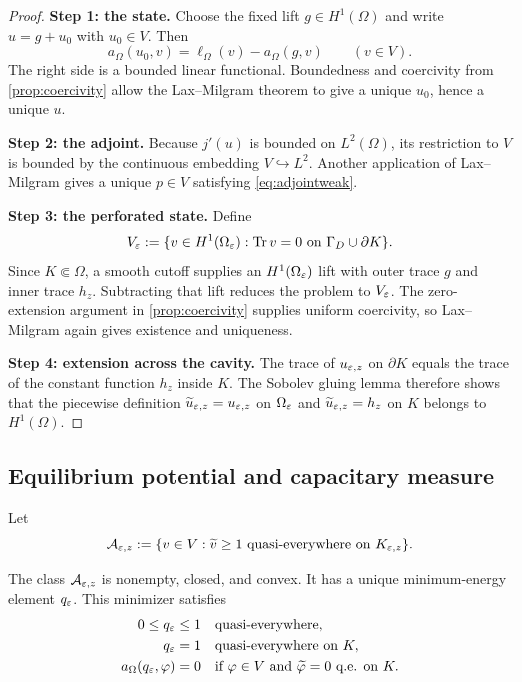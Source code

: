 \begin{proof}
\textbf{Step 1: the state.}
Choose the fixed lift $g\in H^1(\Omega)$ and write $u=g+u_0$ with $u_0\in V$.
Then
\begin{equation}
 a_\Omega(u_0,v)=\ell_\Omega(v)-a_\Omega(g,v)
 \qquad(v\in V).
\end{equation}
The right side is a bounded linear functional.  Boundedness and coercivity
from \cref{prop:coercivity} allow the Lax--Milgram theorem to give a unique
$u_0$, hence a unique $u$.

\textbf{Step 2: the adjoint.}
Because $j'(u)$ is bounded on $L^2(\Omega)$, its restriction to $V$ is bounded
by the continuous embedding $V\hookrightarrow L^2$.  Another application of
Lax--Milgram gives a unique $p\in V$ satisfying
\cref{eq:adjointweak}.

\textbf{Step 3: the perforated state.}
Define
\begin{equation}
 V_\varepsilon:=\{v\in H^1(\Omega_\varepsilon):
 \operatorname{Tr}v=0\text{ on }\Gamma_D\cup\partial K\}.
\end{equation}
Since $K\Subset\Omega$, a smooth cutoff supplies an $H^1(\Omega_\varepsilon)$ lift
with outer trace $g$ and inner trace $h_z$.  Subtracting that lift reduces the
problem to $V_\varepsilon$.  The zero-extension argument in
\cref{prop:coercivity} supplies uniform coercivity, so Lax--Milgram again gives
existence and uniqueness.

\textbf{Step 4: extension across the cavity.}
The trace of $u_{\varepsilon,z}$ on $\partial K$ equals the trace of the constant
function $h_z$ inside $K$.  The Sobolev gluing lemma therefore shows that the
piecewise definition $\widetilde u_{\varepsilon,z}=u_{\varepsilon,z}$ on $\Omega_\varepsilon$ and
$\widetilde u_{\varepsilon,z}=h_z$ on $K$ belongs to $H^1(\Omega)$.
\end{proof}

\subsection{Equilibrium potential and capacitary measure}

Let
\begin{equation}
 \mathcal A_{\varepsilon,z}:=\{v\in V:\widetilde v\ge1
 \text{ quasi-everywhere on }K_{\varepsilon,z}\}.
\end{equation}

\begin{lemma}
\label{lem:equilibrium}
The class $\mathcal A_{\varepsilon,z}$ is nonempty, closed, and convex.  It has a
unique minimum-energy element $q_\varepsilon$.  This minimizer satisfies
\begin{align}
 0\le q_\varepsilon&\le1\quad\text{quasi-everywhere},\notag\\
 q_\varepsilon&=1\quad\text{quasi-everywhere on }K,
 \label{eq:qrange}\\
 a_\Omega(q_\varepsilon,\varphi)&=0
 \quad\text{if }\varphi\in V
 \text{ and }\widetilde\varphi=0\text{ q.e. on }K.
 \label{eq:qharmonic}
\end{align}
\end{lemma}

